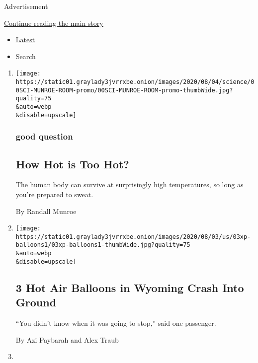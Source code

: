 Advertisement

\protect\hyperlink{after-mid1}{Continue reading the main story}

\begin{itemize}
\tightlist
\item
  \protect\hyperlink{stream-panel}{Latest}
\item
  Search
\end{itemize}

\begin{enumerate}
\def\labelenumi{\arabic{enumi}.}
\item
  \href{/2020/08/04/science/randall-munroe-xkcd-temperature.html}{}

  \texttt{[image: https://static01.graylady3jvrrxbe.onion/images/2020/08/04/science/00SCI-MUNROE-ROOM-promo/00SCI-MUNROE-ROOM-promo-thumbWide.jpg?quality=75\\\&auto=webp\\\&disable=upscale]}

  \hypertarget{good-question}{%
  \subsubsection{good question}\label{good-question}}

  \hypertarget{how-hot-is-too-hot}{%
  \subsection{How Hot is Too Hot?}\label{how-hot-is-too-hot}}

  The human body can survive at surprisingly high temperatures, so long
  as you're prepared to sweat.

  By Randall Munroe
\item
  \href{/2020/08/04/us/wyoming-hot-air-balloons-crash.html}{}

  \texttt{[image: https://static01.graylady3jvrrxbe.onion/images/2020/08/03/us/03xp-balloons1/03xp-balloons1-thumbWide.jpg?quality=75\\\&auto=webp\\\&disable=upscale]}

  \hypertarget{3-hot-air-balloons-in-wyoming-crash-into-ground}{%
  \subsection{3 Hot Air Balloons in Wyoming Crash Into
  Ground}\label{3-hot-air-balloons-in-wyoming-crash-into-ground}}

  ``You didn't know when it was going to stop,'' said one passenger.

  By Azi Paybarah and Alex Traub
\item
  \href{/2020/08/03/us/racism-massachusetts-grandfathering.html}{}


\end{enumerate}
